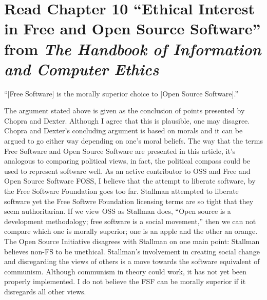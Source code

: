 \section{Read Chapter 10 ``Ethical Interest in Free and Open Source Software'' from \textit{The Handbook of Information and Computer Ethics}}
\begin{center}
``[Free Software] is the morally superior choice to [Open Source Software].''
\end{center}
The argument stated above is given as the conclusion of points presented by Chopra and Dexter. Although I agree that this is plausible, one may disagree. Chopra and Dexter's concluding argument is based on morals and it can be argued to go either way depending on one's moral beliefs. The way that the terms Free Software and Open Source Software are presented in this article, it's analogous to comparing political views, in fact, the political compass could be used to represent software well. As an active contributor to OSS and Free and Open Source Software FOSS, I believe that the attempt to liberate software, by the Free Software Foundation goes too far. Stallman attempted to liberate software yet the Free Softwre Foundation licensing terms are so tight that they seem authoritarian. If we view OSS as Stallman does, ``Open source is a development methodology; free software is a social movement,'' then we can not compare which one is morally superior; one is an apple and the other an orange. The Open Source Initiative disagrees with Stallman on one main point: Stallman believes non-FS to be unethical. Stallman's involvement in creating social change and disregarding the views of others is a move towards the software equivalent of communism. Although communism in theory could work, it has not yet been properly implemented. I do not believe the FSF can be morally superior if it disregards all other views.